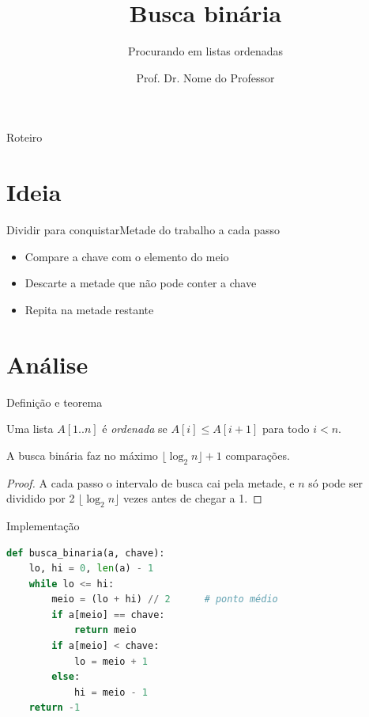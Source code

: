 \documentclass[aspectratio=169,10pt,brazil]{beamer}
\title[Busca binária]{Busca binária}
\subtitle{Procurando em listas ordenadas}
\author[Prof. Nome do Professor]{Prof. Dr. Nome do Professor}
\institute{Departamento de Computação\\Universidade Estadual de Londrina}
\begin{document}
\maketitle

\begin{frame}{Roteiro}
  \tableofcontents
\end{frame}

\section{Ideia}

\begin{frame}{Dividir para conquistar}{Metade do trabalho a cada passo}
  \begin{itemize}
    \item Compare a chave com o elemento do \alert{meio}
    \item Descarte a metade que não pode conter a chave
    \item Repita na metade restante
  \end{itemize}
\end{frame}

\section{Análise}

\begin{frame}{Definição e teorema}
  \begin{definition}
    Uma lista $A[1..n]$ é \emph{ordenada} se $A[i] \le A[i+1]$ para todo $i < n$.
  \end{definition}
  \begin{theorem}
    A busca binária faz no máximo $\lfloor \log_2 n \rfloor + 1$ comparações.
  \end{theorem}
  \begin{proof}
    A cada passo o intervalo de busca cai pela metade, e $n$ só pode ser dividido
    por 2 $\lfloor \log_2 n \rfloor$ vezes antes de chegar a 1.
  \end{proof}
\end{frame}

\begin{frame}[fragile]{Implementação}
\begin{lstlisting}[language=Python]
def busca_binaria(a, chave):
    lo, hi = 0, len(a) - 1
    while lo <= hi:
        meio = (lo + hi) // 2      # ponto médio
        if a[meio] == chave:
            return meio
        if a[meio] < chave:
            lo = meio + 1
        else:
            hi = meio - 1
    return -1
\end{lstlisting}
\end{frame}
\end{document}
